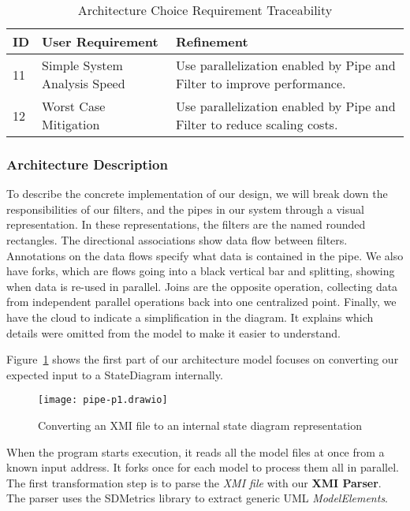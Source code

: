 \begin{table}[htbp]
    \centering
    \caption{Architecture Choice Requirement Traceability}\label{tab:arch-choice-table}
    \begin{tabularx}{\textwidth}{| l | l | X |}
        \hline
        \textbf{ID} & \textbf{User Requirement} & \textbf{Refinement} \\
        \hline
        11 & Simple System Analysis Speed & Use parallelization enabled by Pipe and Filter to improve performance. \\ \hline
        12 & Worst Case Mitigation & Use parallelization enabled by Pipe and Filter to reduce scaling costs.  \\ \hline
    \end{tabularx}
\end{table}

\newpage
\subsubsection{Architecture Description}\label{subsubsec:arch-desc}
To describe the concrete implementation of our design,
we will break down the responsibilities of our filters, and the pipes in our system through a visual representation.
In these representations, the filters are the named rounded rectangles.
The directional associations show data flow between filters.
Annotations on the data flows specify what data is contained in the pipe.
We also have forks, which are flows going into a black vertical bar and splitting, showing when data is re-used in parallel.
Joins are the opposite operation, collecting data from independent parallel operations back into one centralized point.
Finally, we have the cloud to indicate a simplification in the diagram.
It explains which details were omitted from the model to make it easier to understand.

Figure~\ref{fig:pipe-1} shows the first part of our architecture model focuses on converting our expected input to a StateDiagram internally.
\begin{figure}[ht]
    \centering
    \texttt{[image: pipe-p1.drawio]}
    \caption{Converting an XMI file to an internal state diagram representation}
    \label{fig:pipe-1}
\end{figure}

When the program starts execution, it reads all the model files at once from a known input address.
It forks once for each model to process them all in parallel.
The first transformation step is to parse the \textit{XMI file} with our \textbf{XMI Parser}.
The parser uses the SDMetrics library to extract generic UML \textit{ModelElements}.

